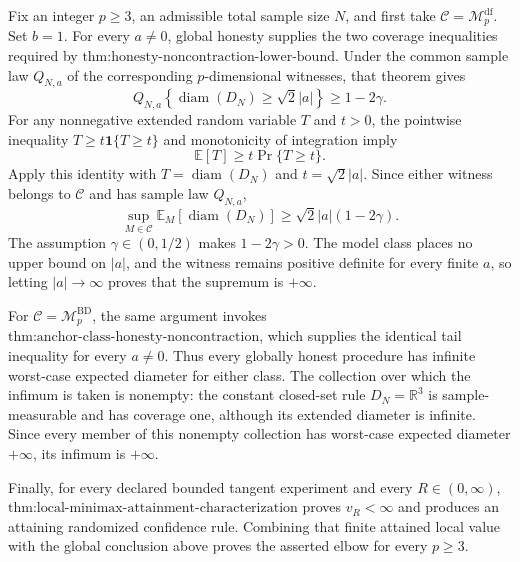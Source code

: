 Fix an integer \(p\ge3\), an admissible total sample size \(N\), and first take \(\mathcal C=\mathcal M_p^{\mathrm{df}}\).  Set \(b=1\).  For every \(a\neq0\), global honesty supplies the two coverage inequalities required by \(\text{thm:honesty-noncontraction-lower-bound}\).  Under the common sample law \(Q_{N,a}\) of the corresponding \(p\)-dimensional witnesses, that theorem gives
\[
 Q_{N,a}\!\left\{\operatorname{diam}(D_N)\ge\sqrt2|a|\right\}\ge1-2\gamma.
\]
For any nonnegative extended random variable \(T\) and \(t>0\), the pointwise inequality \(T\ge t\mathbf 1\{T\ge t\}\) and monotonicity of integration imply
\[
 \mathbb E[T]\ge t\Pr\{T\ge t\}.
\]
Apply this identity with \(T=\operatorname{diam}(D_N)\) and \(t=\sqrt2|a|\).  Since either witness belongs to \(\mathcal C\) and has sample law \(Q_{N,a}\),
\[
 \sup_{M\in\mathcal C}\mathbb E_M\!\left[\operatorname{diam}(D_N)\right]
 \ge \sqrt2|a|(1-2\gamma).
\]
The assumption \(\gamma\in(0,1/2)\) makes \(1-2\gamma>0\).  The model class places no upper bound on \(|a|\), and the witness remains positive definite for every finite \(a\), so letting \(|a|\to\infty\) proves that the supremum is \(+\infty\).

For \(\mathcal C=\mathcal M_p^{\mathrm{BD}}\), the same argument invokes \(\text{thm:anchor-class-honesty-noncontraction}\), which supplies the identical tail inequality for every \(a\neq0\).  Thus every globally honest procedure has infinite worst-case expected diameter for either class.  The collection over which the infimum is taken is nonempty: the constant closed-set rule \(D_N=\mathbb R^3\) is sample-measurable and has coverage one, although its extended diameter is infinite.  Since every member of this nonempty collection has worst-case expected diameter \(+\infty\), its infimum is \(+\infty\).

Finally, for every declared bounded tangent experiment and every \(R\in(0,\infty)\), \(\text{thm:local-minimax-attainment-characterization}\) proves \(v_R<\infty\) and produces an attaining randomized confidence rule.  Combining that finite attained local value with the global conclusion above proves the asserted elbow for every \(p\ge3\).